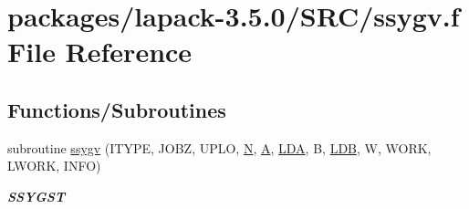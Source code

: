 \hypertarget{ssygv_8f}{}\section{packages/lapack-\/3.5.0/\+S\+R\+C/ssygv.f File Reference}
\label{ssygv_8f}
\subsection*{Functions/\+Subroutines}
\begin{DoxyCompactItemize}
\item 
subroutine \hyperlink{group__realSYeigen_ga0523956327948aae43173b964188e5a2}{ssygv} (I\+T\+Y\+P\+E, J\+O\+B\+Z, U\+P\+L\+O, \hyperlink{polmisc_8c_a0240ac851181b84ac374872dc5434ee4}{N}, \hyperlink{classA}{A}, \hyperlink{example__user_8c_ae946da542ce0db94dced19b2ecefd1aa}{L\+D\+A}, B, \hyperlink{example__user_8c_a50e90a7104df172b5a89a06c47fcca04}{L\+D\+B}, W, W\+O\+R\+K, L\+W\+O\+R\+K, I\+N\+F\+O)
\begin{DoxyCompactList}\small\item\em {\bfseries S\+S\+Y\+G\+S\+T} \end{DoxyCompactList}\end{DoxyCompactItemize}
